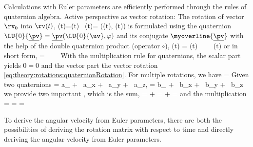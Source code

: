%
Calculations with Euler parameters are efficiently performed through the rules of quaternion algebra.
Active perspective as vector rotation: The rotation of vector $\rv_0$ into $\rv(t)$,
\be \label{eq:theory:rotations:quaternionRotation}
  (t)=(t) \,  \quad {} \quad {}(t)= \Rot((t), \varphi (t))
\ee
is formulated using the quaternion $\LU{0}{\underline{\pv}}=\underline{\pv}(\LU{0}{\uv}, \varphi)$ and its conjugate $\myoverline{\underline{\pv}}$ with the help of the double quaternion product (operator $\circ$),
\be 
  (t) = (t) \, \circ \,  \, \circ \, (t) \eqComma
\ee
or in short form,
\be
{}= \, \circ \,  \, \circ \,  \eqDot
\ee
With the multiplication rule for quaternions, the scalar part yields $0=0$ and the vector part the vector rotation \eqref{eq:theory:rotations:quaternionRotation}. 
For multiple rotations, we have
\be
  = \circ {} \circ {} \circ  {} \circ {} \eqDot
\ee
Given two quaternions
\be
  \underline{\av} = a_ + \, a_x + \, a_y + \, a_z, \quad {} \quad \underline{\bv} = b_ + \, b_x + \, b_y + \, b_z \eqComma
\ee
we provide two important , which is the sum,
\be
  \underline{\cv} = \underline{\av} + \underline{\bv} \quad \ra \quad 
   =  +  =  \eqComma
\ee
and the multiplication
\be
  \underline{\cv} = \underline{\av} \circ \underline{\bv} \neq \underline{\bv} \circ \underline{\av} \quad \ra \quad
   =  \circ {} = 
    \eqDot
\ee


%
To derive the angular velocity from Euler parameters, there are both the possibilities of deriving the rotation matrix with respect to time and directly deriving the angular velocity from Euler parameters.

